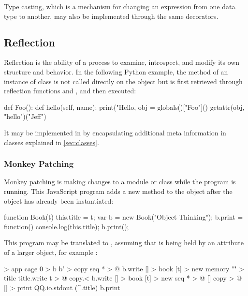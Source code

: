 \documentclass[sigplan,nonacm]{acmart}
\begin{document}
Type casting, which is a mechanism for changing an expression from one data type to another, may also be implemented through the same decorators.

\subsection{Reflection}
\label{sec:reflection}

Reflection is the ability of a process to examine, introspect, and modify its own structure and behavior.
In the following Python example, the method  of an instance of class  is not called directly on the object but is first retrieved through reflection functions  and , and then executed:

\begin{ffcode}
def Foo():
    def hello(self, name):
        print("Hello, %
obj = globals()["Foo"]()
getattr(obj, "hello")("Jeff")
\end{ffcode}

It may be implemented in \eolang{} by encapsulating additional meta information in classes explained in \cref{sec:classes}.

\subsubsection{Monkey Patching}

Monkey patching is making changes to a module or class while the program is running.
This JavaScript program adds a new method  to the object  after the object has already been instantiated:

\begin{ffcode}
function Book(t) { this.title = t; }
var b = new Book("Object Thinking");
b.print = function() {
  console.log(this.title);
}
b.print();
\end{ffcode}

This program may be translated to \eolang{}, assuming that  is being held by an attribute of a larger object, for example :

\begin{ffcode}
[] > app
  cage 0 > b
  b' > copy
  seq * > @
    b.write
      [] > book
        [t] > new
          memory "" > title
          title.write t > @
    copy.<
    b.write
      [] > book
        [t] > new
          seq * > @
            []
              copy > @
              [] > print
                QQ.io.stdout (^.title)
    b.print
\end{ffcode}
\end{document}
